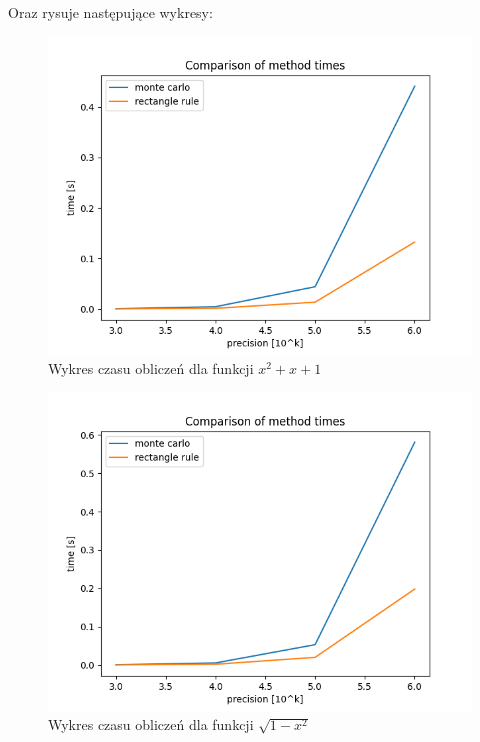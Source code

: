 \documentclass{article}
\begin{document}
\newpage

\noindent
Oraz rysuje następujące wykresy:

\begin{figure}[H]
    \centering
    \includegraphics[width=0.85\linewidth]{plots/plot1.png}
    \caption{Wykres czasu obliczeń dla funkcji \(x^2 + x + 1\)}
    \label{fig:plot1}
\end{figure}

\begin{figure}[H]
    \centering
    \includegraphics[width=0.85\linewidth]{plots/plot2.png}
    \caption{Wykres czasu obliczeń dla funkcji \(\sqrt{1 - x^2}\)}
    \label{fig:plot2}
\end{figure}
\end{document}
